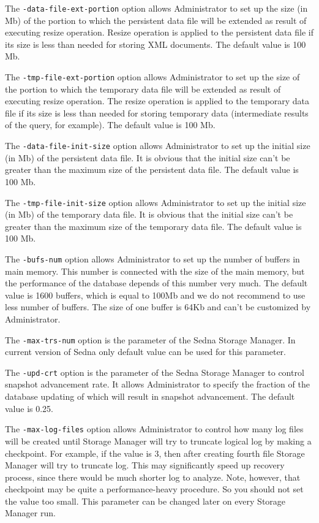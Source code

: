 \documentclass[a4paper,12pt]{article}
\begin{document}
The \verb!-data-file-ext-portion! option allows Administrator to set up the size (in Mb) of the portion to which the persistent data file will be extended as result of executing resize operation. Resize operation is applied to the persistent data file if its size is less than needed for storing XML documents. The default value is 100 Mb.

The \verb!-tmp-file-ext-portion! option allows Administrator to set up the size of the portion to which the temporary data file will be extended as result of executing resize operation. The resize operation is applied to the temporary data file if its size is less than needed for storing temporary data (intermediate results of the query, for example). The default value is 100 Mb.

The \verb!-data-file-init-size! option allows Administrator to set up the initial size (in Mb) of the persistent data file. It is obvious that the initial size can't be greater than the maximum size of the persistent data file. The default value is 100 Mb.

The \verb!-tmp-file-init-size! option allows Administrator to set up the initial size (in Mb) of the temporary data file. It is obvious that the initial size can't be greater than the maximum size of the temporary data file. The default value is 100 Mb.

The \verb!-bufs-num! option allows Administrator to set up the number of buffers in main memory. This number is connected with the size of the main memory, but the performance of the database depends of this number very much. The default value is 1600 buffers, which is equal to 100Mb and we do not recommend to use less number of buffers. The size of one buffer is 64Kb and can't be customized by Administrator.

The \verb!-max-trs-num! option is the parameter of the Sedna Storage Manager. In current version of Sedna only default value can be used for this parameter.

The \verb!-upd-crt! option is the parameter of the Sedna Storage Manager to control snapshot advancement rate. It allows Administrator to specify the fraction of the database updating of which will result in snapshot advancement. The default value is 0.25.

The \verb!-max-log-files! option allows Administrator to control how many log files will be created until Storage Manager will try
to truncate logical log by making a checkpoint. For example, if the value is $3$, then after creating fourth file Storage Manager will try to truncate log. This may significantly speed up recovery process, since there would be much shorter log to analyze. Note, however, that checkpoint may be quite a performance-heavy procedure. So you should not set the value too small. This parameter can be changed later on every Storage Manager run.
\end{document}
